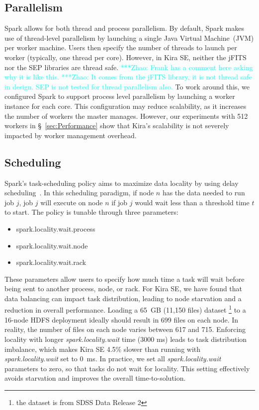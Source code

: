 \documentclass[conference]{IEEEtran}
\newcommand{\zhaonote}[1]{{\textcolor{cyan}    { ***Zhao:      #1 }}}
\newcommand{\zhaonote}[1]{}
\begin{document}
\subsection{Parallelism}

Spark allows for both thread and process parallelism. By default, Spark makes use of
thread-level parallelism by launching a single Java Virtual Machine~(JVM) per worker machine.
Users then specify the number of threads to launch per worker (typically, one thread per core).
However, in Kira SE, neither the jFITS nor the SEP libraries are thread safe. 
\zhaonote{Frank has a comment here asking why it is like this.}
\zhaonote{It comes from the jFITS library, it is not thread safe in design. SEP is not tested for thread parallelism also.}
To work around this,
we configured Spark to support process level parallelism by launching a worker instance for each
core. This configuration may reduce scalability,
as it increases the number of workers the master manages. However, our experiments with 512
workers in \S~\ref{sec:Performance} show that Kira's scalability is not severely impacted by
worker management overhead.

\subsection{Scheduling}

Spark's task-scheduling policy aims to maximize data locality by using
delay scheduling~\cite{zaharia10ds}. In this scheduling paradigm, if node $n$ has the data needed
to run job $j$, job $j$ will execute on node $n$ if job $j$ would wait less than a threshold time
$t$ to start. The policy is tunable through three parameters:

\begin{itemize}
\item{spark.locality.wait.process}
\item{spark.locality.wait.node}
\item{spark.locality.wait.rack}
\end{itemize}

These parameters allow users to specify how much time a task will wait before being sent to another
process, node, or rack. For Kira SE, we have found that data balancing can 
impact task distribution, leading to node starvation and a reduction in overall performance.
Loading a 65~GB (11,150 files) dataset \footnote{the dataset is from SDSS Data Release 2} to a 16-node HDFS deployment ideally should result in 699 files on each node.
In reality, the number of files on each node varies between 617 and 715.
Enforcing locality with longer {\em spark.locality.wait} time (3000 ms) leads to task distribution imbalance, which makes
Kira SE 4.5\% slower than running with {\em spark.locality.wait} set to 0~ms.
In practice, we set all {\em spark.locality.wait} parameters to zero, so that tasks do not wait for locality.
This setting effectively avoids starvation and improves the overall time-to-solution.
\end{document}
